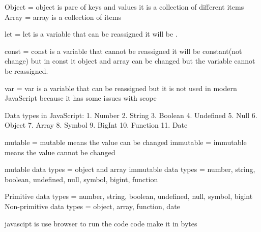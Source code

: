 Object = object is pare of keys and values it is a collection of different items
Array = array is a collection of items



let = let is a variable that can be reassigned it will be .



const = const is a variable that cannot be reassigned it will be constant(not change)
but in const it object and array can be changed but the variable cannot be reassigned.



var = var is a variable that can be reassigned but it is not used in modern JavaScript because it has some issues with scope




Data types in JavaScript:
1. Number
2. String
3. Boolean
4. Undefined
5. Null
6. Object
7. Array
8. Symbol
9. BigInt
10. Function
11. Date    


mutable = mutable means the value can be changed
immutable = immutable means the value cannot be changed

mutable data types = object and array
immutable data types = number, string, boolean, undefined, null, symbol, bigint, function

Primitive data types = number, string, boolean, undefined, null, symbol, bigint
Non-primitive data types = object, array, function, date


javascipt is use browser to run the code 
code make it in bytes
